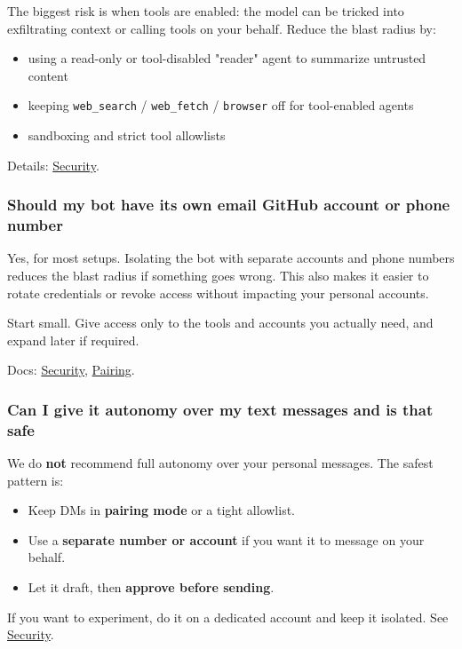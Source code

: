 The biggest risk is when tools are enabled: the model can be tricked into
exfiltrating context or calling tools on your behalf. Reduce the blast radius by:

\begin{itemize}
  \item using a read-only or tool-disabled "reader" agent to summarize untrusted content
  \item keeping \texttt{web\_search} / \texttt{web\_fetch} / \texttt{browser} off for tool-enabled agents
  \item sandboxing and strict tool allowlists
\end{itemize}


Details: \href{/gateway/security}{Security}.

\subsubsection{Should my bot have its own email GitHub account or phone number}


Yes, for most setups. Isolating the bot with separate accounts and phone numbers
reduces the blast radius if something goes wrong. This also makes it easier to rotate
credentials or revoke access without impacting your personal accounts.

Start small. Give access only to the tools and accounts you actually need, and expand
later if required.

Docs: \href{/gateway/security}{Security}, \href{/channels/pairing}{Pairing}.

\subsubsection{Can I give it autonomy over my text messages and is that safe}


We do \textbf{not} recommend full autonomy over your personal messages. The safest pattern is:

\begin{itemize}
  \item Keep DMs in \textbf{pairing mode} or a tight allowlist.
  \item Use a \textbf{separate number or account} if you want it to message on your behalf.
  \item Let it draft, then \textbf{approve before sending}.
\end{itemize}


If you want to experiment, do it on a dedicated account and keep it isolated. See
\href{/gateway/security}{Security}.

